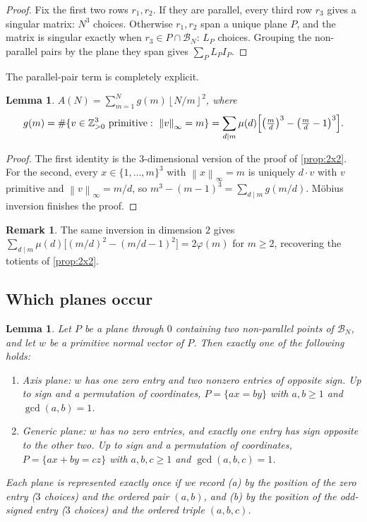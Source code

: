 \documentclass[11pt]{article}
\newtheorem{lemma}[theorem]{Lemma}
\theoremstyle{definition}
\newtheorem{remark}[theorem]{Remark}
\newcommand{\Z}{\mathbb{Z}}
\newcommand{\BN}{\mathcal{B}_N}
\newcommand{\floor}[1]{\left\lfloor #1 \right\rfloor}
\newcommand{\norm}[1]{\left\lVert #1 \right\rVert}
\begin{document}
\begin{proof}
Fix the first two rows $r_1,r_2$. If they are parallel, every third row $r_3$ gives a singular matrix: $N^3$ choices. Otherwise $r_1,r_2$ span a unique plane $P$, and the matrix is singular exactly when $r_3\in P\cap\BN$: $L_P$ choices. Grouping the non-parallel pairs by the plane they span gives $\sum_P L_P I_P$.
\end{proof}

The parallel-pair term is completely explicit.

\begin{lemma}\label{lem:A}
$A(N)=\sum_{m=1}^{N}g(m)\floor{N/m}^2$, where
\[
g(m)=\#\{v\in\Z_{>0}^3\ \text{primitive}:\ \norm{v}_\infty=m\}=\sum_{d\mid m}\mu(d)\Bigl[\bigl(\tfrac md\bigr)^3-\bigl(\tfrac md-1\bigr)^3\Bigr].
\]
\end{lemma}

\begin{proof}
The first identity is the $3$-dimensional version of the proof of \cref{prop:2x2}. For the second, every $x\in\{1,\dots,m\}^3$ with $\norm{x}_\infty=m$ is uniquely $d\cdot v$ with $v$ primitive and $\norm{v}_\infty=m/d$, so $m^3-(m-1)^3=\sum_{d\mid m}g(m/d)$. Möbius inversion finishes the proof.
\end{proof}

\begin{remark}
The same inversion in dimension $2$ gives $\sum_{d\mid m}\mu(d)\bigl[(m/d)^2-(m/d-1)^2\bigr]=2\varphi(m)$ for $m\ge2$, recovering the totients of \cref{prop:2x2}.
\end{remark}

\subsection{Which planes occur}

\begin{lemma}\label{lem:planes}
Let $P$ be a plane through $0$ containing two non-parallel points of $\BN$, and let $w$ be a primitive normal vector of $P$. Then exactly one of the following holds:
\begin{enumerate}[label=(\alph*)]
\item \emph{Axis plane}: $w$ has one zero entry and two nonzero entries of opposite sign. Up to sign and a permutation of coordinates, $P=\{ax=by\}$ with $a,b\ge1$ and $\gcd(a,b)=1$.
\item \emph{Generic plane}: $w$ has no zero entries, and exactly one entry has sign opposite to the other two. Up to sign and a permutation of coordinates, $P=\{ax+by=cz\}$ with $a,b,c\ge1$ and $\gcd(a,b,c)=1$.
\end{enumerate}
Each plane is represented exactly once if we record (a) by the position of the zero entry ($3$ choices) and the ordered pair $(a,b)$, and (b) by the position of the odd-signed entry ($3$ choices) and the ordered triple $(a,b,c)$.
\end{lemma}
\end{document}
